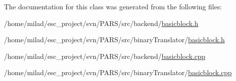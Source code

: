 The documentation for this class was generated from the following files:\begin{DoxyCompactItemize}
\item 
/home/milad/esc\_\-project/svn/PARS/src/backend/\hyperlink{backend_2basicblock_8h}{basicblock.h}\item 
/home/milad/esc\_\-project/svn/PARS/src/binaryTranslator/\hyperlink{binaryTranslator_2basicblock_8h}{basicblock.h}\item 
/home/milad/esc\_\-project/svn/PARS/src/backend/\hyperlink{backend_2basicblock_8cpp}{basicblock.cpp}\item 
/home/milad/esc\_\-project/svn/PARS/src/binaryTranslator/\hyperlink{binaryTranslator_2basicblock_8cpp}{basicblock.cpp}\end{DoxyCompactItemize}
